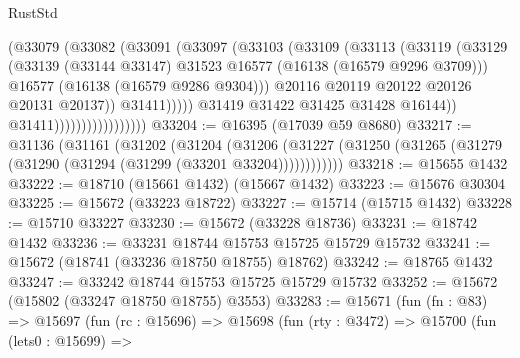 \begin{lexlean}{RustStd}
\begin{coremodule}
                                        (@33079
                                          (@33082
                                            (@33091
                                              (@33097
                                                (@33103
                                                  (@33109
                                                    (@33113
                                                      (@33119
                                                        (@33129
                                                          (@33139
                                                            (@33144 @33147)
                                                            @31523
                                                            @16577
                                                            (@16138 (@16579 @9296 @3709)))
                                                          @16577
                                                          (@16138 (@16579 @9286 @9304)))
                                                        @20116
                                                        @20119
                                                        @20122
                                                        @20126
                                                        @20131
                                                        @20137))
                                                    @31411)))))
                                          @31419
                                          @31422
                                          @31425
                                          @31428
                                          @16144))
                                      @31411)))))))))))))))))
@33204 := @16395 (@17039 @59 @8680)
@33217 := @31136
    (@31161
      (@31202
        (@31204
          (@31206 (@31227 (@31250 (@31265 (@31279 (@31290 (@31294 (@31299 (@33201 @33204))))))))))))
@33218 := @15655 @1432
@33222 := @18710 (@15661 @1432) (@15667 @1432)
@33223 := @15676 @30304
@33225 := @15672 (@33223 @18722)
@33227 := @15714 (@15715 @1432)
@33228 := @15710 @33227
@33230 := @15672 (@33228 @18736)
@33231 := @18742 @1432
@33236 := @33231 @18744 @15753 @15725 @15729 @15732
@33241 := @15672 (@18741 (@33236 @18750 @18755) @18762)
@33242 := @18765 @1432
@33247 := @33242 @18744 @15753 @15725 @15729 @15732
@33252 := @15672 (@15802 (@33247 @18750 @18755) @3553)
@33283 := @15671
    (fun (fn : @83) =>
    @15697
      (fun (rc : @15696) =>
      @15698
        (fun (rty : @3472) =>
        @15700
          (fun (lets0 : @15699) =>

\end{coremodule}
\end{lexlean}
